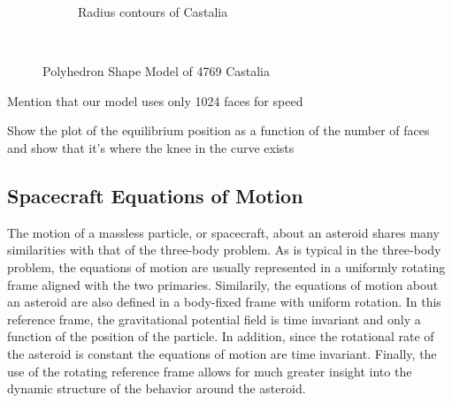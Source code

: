 \documentclass[]{aiaa-tc}%
\begin{document}
\begin{figure}
\begin{subfigure}[htbp]{0.5\textwidth}
        \caption{Radius contours of Castalia} \label{fig:radius_contour}
    \end{subfigure} ~ %
    \caption{Polyhedron Shape Model of 4769 Castalia}
    \label{fig:castalia}
\end{figure}


Mention that our model uses only 1024 faces for speed

Show the plot of the equilibrium position as a function of the number of faces and show that it's where the knee in the curve exists

\subsection{Spacecraft Equations of Motion}\label{sec:sc_eoms}

The motion of a massless particle, or spacecraft, about an asteroid shares many similarities with that of the three-body problem.
As is typical in the three-body problem, the equations of motion are usually represented in a uniformly rotating frame aligned with the two primaries.
Similarily, the equations of motion about an asteroid are also defined in a body-fixed frame with uniform rotation.
In this reference frame, the gravitational potential field is time invariant and only a function of the position of the particle.
In addition, since the rotational rate of the asteroid is constant the equations of motion are time invariant.
Finally, the use of the rotating reference frame allows for much greater insight into the dynamic structure of the behavior around the asteroid.
\end{document}
